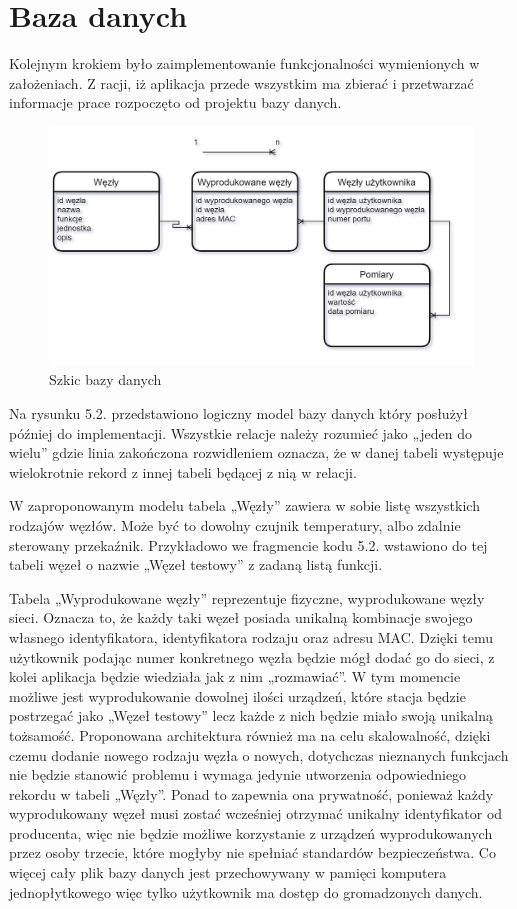 \documentclass[12pt, twoside, openany]{mwrep}
\begin{document}
\section{Baza danych}
Kolejnym krokiem było zaimplementowanie funkcjonalności wymienionych w założeniach. Z racji, iż aplikacja przede wszystkim ma zbierać i przetwarzać informacje prace rozpoczęto od projektu bazy danych. 
\begin{figure}[H]
\centering
\includegraphics[scale=0.5]{db}
\caption{Szkic bazy danych}
\end{figure}
\par
Na rysunku 5.2. przedstawiono logiczny model bazy danych który posłużył później do implementacji. Wszystkie relacje należy rozumieć jako „jeden do wielu” gdzie linia zakończona rozwidleniem oznacza, że w danej tabeli występuje wielokrotnie rekord z innej tabeli będącej z nią w relacji. \par
W zaproponowanym modelu tabela „Węzły” zawiera w sobie listę wszystkich rodzajów węzłów. Może być to dowolny czujnik temperatury, albo zdalnie sterowany przekaźnik. Przykładowo we fragmencie kodu 5.2. wstawiono do tej tabeli węzeł o nazwie „Węzeł testowy” z zadaną listą funkcji.  \par
Tabela „Wyprodukowane węzły” reprezentuje fizyczne, wyprodukowane węzły sieci. Oznacza to, że każdy taki węzeł posiada unikalną kombinacje swojego własnego identyfikatora, identyfikatora rodzaju oraz adresu MAC. Dzięki temu użytkownik podając numer konkretnego węzła będzie mógł dodać go do sieci, z kolei aplikacja będzie wiedziała jak z nim „rozmawiać”. W tym momencie możliwe jest wyprodukowanie dowolnej ilości urządzeń, które stacja będzie postrzegać jako „Węzeł testowy” lecz każde z nich będzie miało swoją unikalną tożsamość.
Proponowana architektura również ma na celu skalowalność, dzięki czemu dodanie nowego rodzaju węzła o nowych, dotychczas nieznanych funkcjach nie będzie stanowić problemu i wymaga jedynie utworzenia odpowiedniego rekordu w tabeli „Węzły”. Ponad to zapewnia ona prywatność, ponieważ każdy wyprodukowany węzeł musi zostać wcześniej otrzymać unikalny identyfikator od producenta, więc nie będzie możliwe korzystanie z urządzeń wyprodukowanych przez osoby trzecie, które mogłyby nie spełniać standardów bezpieczeństwa. Co więcej cały plik bazy danych jest przechowywany w pamięci komputera jednopłytkowego więc tylko użytkownik ma dostęp do gromadzonych danych.
\end{document}
